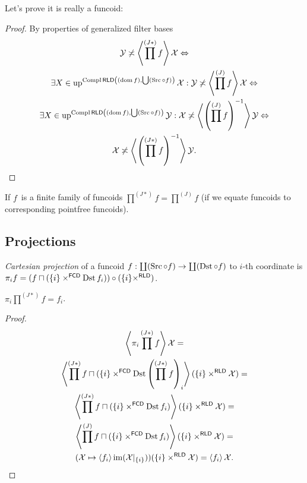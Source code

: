 Let's prove it is really a funcoid:

\begin{proof}
By properties of generalized filter bases
\begin{multline*}
\mathcal{Y}\not\asymp\left\langle \prod^{(J\ast)} f\right\rangle\mathcal{X}
\Leftrightarrow\\
\exists X\in\operatorname{up}^{\operatorname{Compl}\mathsf{RLD}\left((\operatorname{dom} f),\bigcup(\operatorname{Src}\circ f)\right)}\mathcal{X}:
\mathcal{Y}\not\asymp\left\langle \prod^{(J)}f\right\rangle\mathcal{X}
\Leftrightarrow\\
\exists X\in\operatorname{up}^{\operatorname{Compl}\mathsf{RLD}\left((\operatorname{dom} f),\bigcup(\operatorname{Src}\circ f)\right)}\mathcal{Y}:
\mathcal{X}\not\asymp\left\langle \left(\prod^{(J)}f\right)^{-1}\right\rangle\mathcal{Y}
\Leftrightarrow\\
\mathcal{X}\not\asymp
\left\langle \left(\prod^{(J\ast)} f\right)^{-1}\right\rangle\mathcal{Y}.
\end{multline*}
\end{proof}

\begin{obvious}
If $f$~is a finite family of funcoids $\prod^{(J\ast)}f=\prod^{(J)}f$ (if we equate funcoids to corresponding pointfree funcoids).
\end{obvious}

\subsection{Projections}

\begin{defn}
\emph{Cartesian projection} of a funcoid $f: \coprod(\operatorname{Src}\circ f)\to\coprod(\operatorname{Dst}\circ f)$ to $i$-th coordinate is
$\pi_i f=
(f\sqcap(\{i\}\times^{\mathsf{FCD}}\operatorname{Dst} f_i))\circ
(\{i\}\times^{\mathsf{RLD}})$.
\end{defn}

\begin{thm}
$\pi_i\prod^{(J\ast)}f=f_i$.
\end{thm}

\begin{proof}
\begin{multline*}
\left\langle \pi_i\prod^{(J\ast)}f\right\rangle\mathcal{X} =\\
\left\langle \prod^{(J\ast)}f\sqcap(\{i\}\times^{\mathsf{FCD}}\operatorname{Dst} \left(\prod^{(J\ast)}f\right)_i\right\rangle(\{i\}\times^{\mathsf{RLD}}\mathcal{X})=\\
\left\langle \prod^{(J\ast)}f\sqcap(\{i\}\times^{\mathsf{FCD}}\operatorname{Dst} f_i)\right\rangle(\{i\}\times^{\mathsf{RLD}}\mathcal{X})=\\
\left\langle \prod^{(J)}f\sqcap(\{i\}\times^{\mathsf{FCD}}\operatorname{Dst} f_i)\right\rangle(\{i\}\times^{\mathsf{RLD}}\mathcal{X})=\\
(\mathcal{X}\mapsto\left\langle f_i\right\rangle\operatorname{im}(\mathcal{X}|_{\{i\}}))(\{i\}\times^{\mathsf{RLD}}\mathcal{X})=
\left\langle f_i\right\rangle\mathcal{X}.
\end{multline*}
\end{proof}

